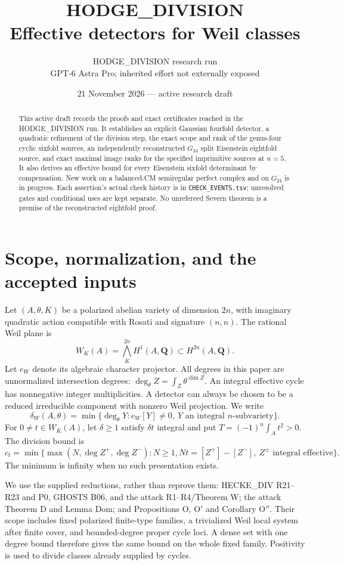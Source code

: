 \documentclass[11pt]{article}
\title{HODGE\_DIVISION\\Effective detectors for Weil classes}
\author{HODGE\_DIVISION research run\\GPT-6 Astra Pro; inherited effort not externally exposed}
\date{21 November 2026 --- active research draft}
\theoremstyle{remark}\newtheorem{remark}[theorem]{Remark}
\newcommand{\Q}{\mathbf Q}\newcommand{\Z}{\mathbf Z}
\begin{document}
\maketitle

\begin{abstract}
This active draft records the proofs and exact certificates reached in the
HODGE\_DIVISION run. It establishes an explicit Gaussian fourfold detector,
a quadratic refinement of the division step, the exact scope and rank of
the genus-four cyclic sixfold sources, an independently reconstructed
$G_{34}$ split Eisenstein eightfold source, and exact maximal image ranks
for the specified imprimitive sources at $n=5$. It also derives an effective
bound for every Eisenstein sixfold determinant by compensation. New work
on a balanced-CM semiregular perfect complex and on $G_{24}$ is in progress.
Each assertion's actual check history is in \texttt{CHECK\_EVENTS.tsv};
unresolved gates and conditional uses are kept separate. No unrefereed
Severn theorem is a premise of the reconstructed eightfold proof.
\end{abstract}
\tableofcontents

\section{Scope, normalization, and the accepted inputs}

Let $(A,\theta,K)$ be a polarized abelian variety of dimension $2n$, with
imaginary quadratic action compatible with Rosati and signature $(n,n)$.
The rational Weil plane is
\[
 W_K(A)=\bigwedge_K^{2n}H^1(A,\Q)\subset H^{2n}(A,\Q).
\]
Let $e_W$ denote its algebraic character projector. All degrees in this
paper are unnormalized intersection degrees:
$\deg_\theta Z=\int_Z\theta^{\dim Z}$.
An integral effective cycle has nonnegative integer multiplicities.
A detector can always be chosen to be a reduced irreducible component
with nonzero Weil projection. We write
\[
 \delta_W(A,\theta)=\min\{\deg_\theta Y:e_W[Y]\ne0,\ Y
 \text{ an integral }n\text{-subvariety}\}.
\]
For $0\ne t\in W_K(A)$, let $\delta\ge1$ satisfy $\delta t$ integral
and put $T=(-1)^n\int_A t^2>0$. The division bound is
\[
 c_t=\min\{\max(N,\deg Z^+,\deg Z^-):
 N\ge1, Nt=[Z^+]-[Z^-],\ Z^\pm\text{ integral effective}\}.
\]
The minimum is infinity when no such presentation exists.

We use the supplied reductions, rather than reprove them: HECKE\_DIV
R21--R23 and P0, GHOSTS B06, and the attack R1--R4/Theorem W;
the attack Theorem D and Lemma Dom; and Propositions O, O$'$ and
Corollary O$''$. Their scope includes fixed polarized finite-type
families, a trivialized Weil local system after finite cover, and
bounded-degree proper cycle loci. A dense set with one degree bound
therefore gives the same bound on the whole fixed family. Positivity
is used to divide classes already supplied by cycles.
\end{document}

